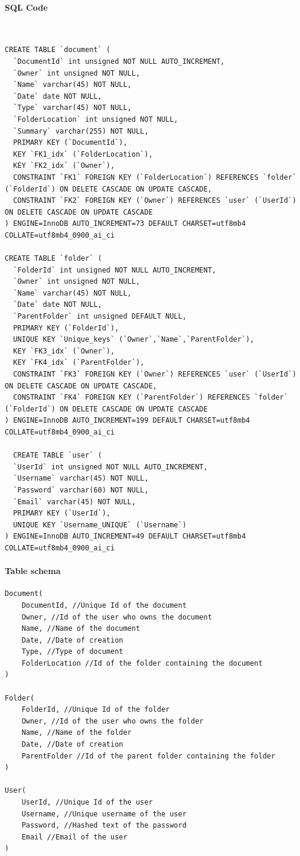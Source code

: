 \documentclass[a4paper,12pt]{article}
\newcommand{\myparagraph}[1]{\paragraph{#1}\mbox{}\\}
\begin{document}
\myparagraph{SQL Code}
\begin{lstlisting}
CREATE TABLE `document` (
  `DocumentId` int unsigned NOT NULL AUTO_INCREMENT,
  `Owner` int unsigned NOT NULL,
  `Name` varchar(45) NOT NULL,
  `Date` date NOT NULL,
  `Type` varchar(45) NOT NULL,
  `FolderLocation` int unsigned NOT NULL,
  `Summary` varchar(255) NOT NULL,
  PRIMARY KEY (`DocumentId`),
  KEY `FK1_idx` (`FolderLocation`),
  KEY `FK2_idx` (`Owner`),
  CONSTRAINT `FK1` FOREIGN KEY (`FolderLocation`) REFERENCES `folder` (`FolderId`) ON DELETE CASCADE ON UPDATE CASCADE,
  CONSTRAINT `FK2` FOREIGN KEY (`Owner`) REFERENCES `user` (`UserId`) ON DELETE CASCADE ON UPDATE CASCADE
) ENGINE=InnoDB AUTO_INCREMENT=73 DEFAULT CHARSET=utf8mb4 COLLATE=utf8mb4_0900_ai_ci

CREATE TABLE `folder` (
  `FolderId` int unsigned NOT NULL AUTO_INCREMENT,
  `Owner` int unsigned NOT NULL,
  `Name` varchar(45) NOT NULL,
  `Date` date NOT NULL,
  `ParentFolder` int unsigned DEFAULT NULL,
  PRIMARY KEY (`FolderId`),
  UNIQUE KEY `Unique_keys` (`Owner`,`Name`,`ParentFolder`),
  KEY `FK3_idx` (`Owner`),
  KEY `FK4_idx` (`ParentFolder`),
  CONSTRAINT `FK3` FOREIGN KEY (`Owner`) REFERENCES `user` (`UserId`) ON DELETE CASCADE ON UPDATE CASCADE,
  CONSTRAINT `FK4` FOREIGN KEY (`ParentFolder`) REFERENCES `folder` (`FolderId`) ON DELETE CASCADE ON UPDATE CASCADE
) ENGINE=InnoDB AUTO_INCREMENT=199 DEFAULT CHARSET=utf8mb4 COLLATE=utf8mb4_0900_ai_ci
  
  CREATE TABLE `user` (
  `UserId` int unsigned NOT NULL AUTO_INCREMENT,
  `Username` varchar(45) NOT NULL,
  `Password` varchar(60) NOT NULL,
  `Email` varchar(45) NOT NULL,
  PRIMARY KEY (`UserId`),
  UNIQUE KEY `Username_UNIQUE` (`Username`)
) ENGINE=InnoDB AUTO_INCREMENT=49 DEFAULT CHARSET=utf8mb4 COLLATE=utf8mb4_0900_ai_ci
\end{lstlisting}
\newpage

\paragraph{Table schema}
\begin{verbatim}
Document(
	DocumentId, //Unique Id of the document
	Owner, //Id of the user who owns the document
	Name, //Name of the document
	Date, //Date of creation
	Type, //Type of document
	FolderLocation //Id of the folder containing the document
)

Folder(
	FolderId, //Unique Id of the folder
	Owner, //Id of the user who owns the folder
	Name, //Name of the folder
	Date, //Date of creation
	ParentFolder //Id of the parent folder containing the folder
)

User(
	UserId, //Unique Id of the user
	Username, //Unique username of the user
	Password, //Hashed text of the password
	Email //Email of the user
)
\end{verbatim}
\end{document}
